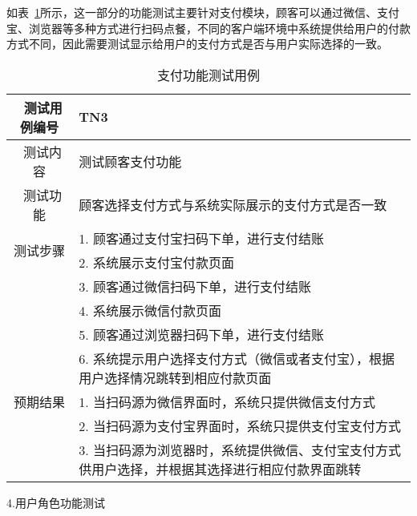 如表~\ref{table:tn3}所示，这一部分的功能测试主要针对支付模块，顾客可以通过微信、支付宝、浏览器等多种方式进行扫码点餐，不同的客户端环境中系统提供给用户的付款方式不同，因此需要测试显示给用户的支付方式是否与用户实际选择的一致。
\begin{table}[htbp!]
    \footnotesize
    \centering
    \caption{支付功能测试用例}
    \vspace{2mm}
    \begin{tabular}{cp{11.5cm}}
     \hline
     \ 测试用例编号 & TN3 \\ 
     \hline
     \ 测试内容 & 测试顾客支付功能 \\ 
     \hline
     \ 测试功能 & 顾客选择支付方式与系统实际展示的支付方式是否一致 \\ 
     \hline
     \multirow{2}{*}{测试步骤}
      & 1.	顾客通过支付宝扫码下单，进行支付结账\\
      & 2.	系统展示支付宝付款页面 \\
      & 3.	顾客通过微信扫码下单，进行支付结账\\
      & 4.	系统展示微信付款页面 \\
      & 5.	顾客通过浏览器扫码下单，进行支付结账\\
      & 6.	系统提示用户选择支付方式（微信或者支付宝），根据用户选择情况跳转到相应付款页面 \\
     \hline
     \multirow{1}{*}{预期结果}
      & 1. 当扫码源为微信界面时，系统只提供微信支付方式\\
      & 2. 当扫码源为支付宝界面时，系统只提供支付宝支付方式\\
      & 3. 当扫码源为浏览器时，系统提供微信、支付宝支付方式供用户选择，并根据其选择进行相应付款界面跳转\\
    \hline
    \end{tabular}   
    \label{table:tn3}
\end{table}

4.用户角色功能测试

